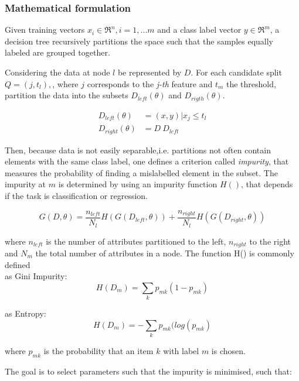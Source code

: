 \subsubsection{Mathematical formulation}

Given training vectors $x_i \in \Re^n, i = {1 , ... m} $ and a class label vector $y \in \Re^m$, a decision tree recursively partitions the space such that the samples equally labeled are grouped together. 

Considering the data at node $l$ be represented by $D$. For each candidate split $Q= (j, t_l),$, where $j$ corresponds to the \textit{j-th} feature and $t_m$ the threshold, partition the data into the subsets $D_{left}(\theta)$ and $D_{rigth}(\theta) $.

\begin{align}
D_{left}(\theta) &= (x,y) | x_j \le t_l \\
D_{right}(\theta) &= D \ D_{left}
\end{align}

Then, because data is not easily separable,i.e. partitions not often contain elements with the same class label, one defines a criterion called \textit{impurity}, that measures the probability of finding a mislabelled element in the subset. The impurity at $m$ is determined by using an impurity function $H()$, that depends if the task is classification or regression. 

\begin{equation}
G(D,\theta) = \frac{n_{left}}{N_l}H(G(D_{left},\theta)) + \frac{n_{right}}{N_l}H(G(D_{right},\theta)) 
\end{equation}

where $n_{left}$ is the number of attributes partitioned to the left, $n_{right}$ to the right and $N_m$ the total number of attributes in a node. The function H() is commonly defined \\

as Gini Impurity: 
\begin{equation}
	H(D_m) = \sum_k p_{mk}(1-p_{mk})
\end{equation}

as Entropy:
\begin{equation}
H(D_m) = -\sum_k p_{mk}(log(p_{mk})
\end{equation}

where $p_{mk}$ is the probability that an item $k$ with label $m$ is chosen.

The goal is to select parameters such that the impurity is minimised, such that:

